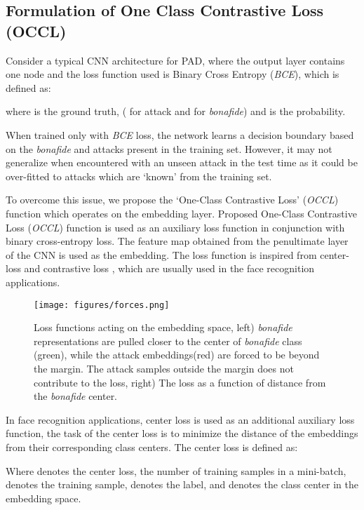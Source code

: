 \documentclass[journal]{IEEEtran}
\begin{document}
\subsection{Formulation of One Class Contrastive Loss (OCCL)}

Consider a typical CNN architecture for PAD, where the output layer contains one node and the loss function used is  Binary Cross Entropy (\textit{BCE}), which is defined as:


where  is the ground truth, ( for attack and  for \textit{bonafide}) and  is the probability.

When trained only with \textit{BCE} loss, the network learns a decision boundary based on the \textit{bonafide} and attacks present in the training set. However, it may not generalize when encountered with an unseen attack in the test time as it could be over-fitted to attacks which are `known' from the training set.

To overcome this issue, we propose the `One-Class Contrastive Loss' (\textit{OCCL}) function which operates on the embedding layer. Proposed One-Class Contrastive Loss (\textit{OCCL}) function is used as an auxiliary loss function in conjunction with binary cross-entropy loss. The feature map obtained from the penultimate layer of the CNN is used as the embedding. The loss function is inspired from  center-loss \cite{wen2016discriminative} and contrastive loss \cite{hadsell2006dimensionality}, which are usually used in the face recognition applications.

\begin{figure}[ht!]
     \centering
         \texttt{[image: figures/forces.png]}
\caption{Loss functions acting on the embedding space, left) \textit{bonafide} representations are pulled closer to the center of \textit{bonafide} class (green), while the attack embeddings(red) are forced to be beyond the margin. The attack samples outside the margin does not contribute to the loss, right) The loss as a function of distance from the \textit{bonafide} center.}
\label{fig:embedding_force}
\end{figure}

In face recognition applications, center loss is used as an additional auxiliary loss function, the task of the center loss is to minimize the distance of the embeddings from their corresponding class centers. The center loss is defined as:


Where  denotes the center loss,  the number of training samples in a mini-batch,  denotes the  training sample,  denotes the label, and  denotes the  class center in the embedding space.
\end{document}
